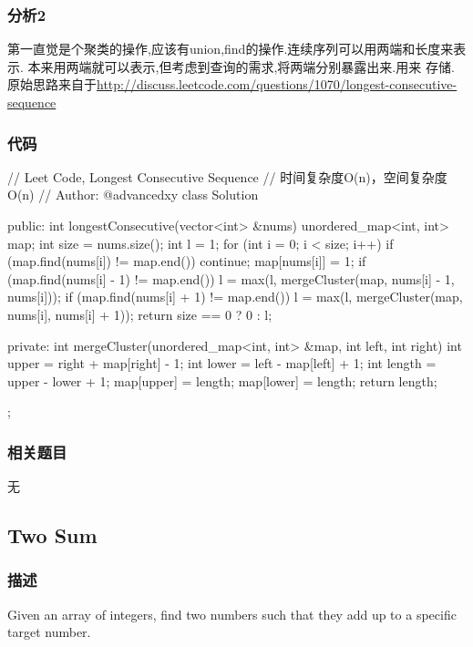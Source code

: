 \subsubsection{分析2}
第一直觉是个聚类的操作,应该有union,find的操作.连续序列可以用两端和长度来表示.
本来用两端就可以表示,但考虑到查询的需求,将两端分别暴露出来.用来
存储.原始思路来自于\url{http://discuss.leetcode.com/questions/1070/longest-consecutive-sequence}

\subsubsection{代码}

\begin{Code}
// Leet Code, Longest Consecutive Sequence
// 时间复杂度O(n)，空间复杂度O(n)
// Author: @advancedxy
class Solution {
public:
    int longestConsecutive(vector<int> &nums) {
        unordered_map<int, int> map;
        int size = nums.size();
        int l = 1;
        for (int i = 0; i < size; i++) {
            if (map.find(nums[i]) != map.end()) continue;
            map[nums[i]] = 1;
            if (map.find(nums[i] - 1) != map.end()) {
                l = max(l, mergeCluster(map, nums[i] - 1, nums[i]));
            }
            if (map.find(nums[i] + 1) != map.end()) {
                l = max(l, mergeCluster(map, nums[i], nums[i] + 1));
            }
        }
        return size == 0 ? 0 : l;
    }

private:
    int mergeCluster(unordered_map<int, int> &map, int left, int right) {
        int upper = right + map[right] - 1;
        int lower = left - map[left] + 1;
        int length = upper - lower + 1;
        map[upper] = length;
        map[lower] = length;
        return length;
    }
};
\end{Code}

\subsubsection{相关题目}
\begindot
\item 无
\myenddot


\subsection{Two Sum} %
\label{sec:Two-sum}


\subsubsection{描述}
Given an array of integers, find two numbers such that they add up to a specific target number.

